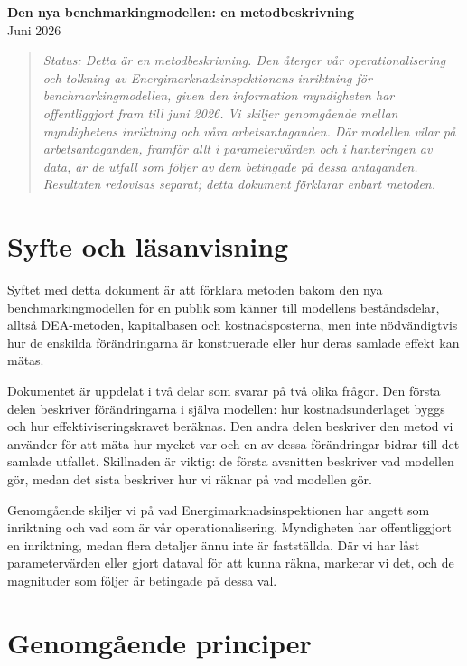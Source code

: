 \documentclass[11pt,a4paper]{article}
\begin{document}
\begin{center}
  {\LARGE\bfseries Den nya benchmarkingmodellen: en metodbeskrivning}\\[4pt]
  {\normalsize Juni 2026}
\end{center}

\begin{quote}\itshape\small
Status: Detta är en metodbeskrivning. Den återger vår operationalisering och tolkning av
Energimarknadsinspektionens inriktning för benchmarkingmodellen, given den information
myndigheten har offentliggjort fram till juni 2026. Vi skiljer genomgående mellan myndighetens
inriktning och våra arbetsantaganden. Där modellen vilar på arbetsantaganden, framför allt i
parametervärden och i hanteringen av data, är de utfall som följer av dem betingade på dessa
antaganden. Resultaten redovisas separat; detta dokument förklarar enbart metoden.
\end{quote}

\section{Syfte och läsanvisning}

Syftet med detta dokument är att förklara metoden bakom den nya benchmarkingmodellen för en
publik som känner till modellens beståndsdelar, alltså DEA-metoden, kapitalbasen och
kostnadsposterna, men inte nödvändigtvis hur de enskilda förändringarna är konstruerade eller
hur deras samlade effekt kan mätas.

Dokumentet är uppdelat i två delar som svarar på två olika frågor. Den första delen beskriver
förändringarna i själva modellen: hur kostnadsunderlaget byggs och hur effektiviseringskravet
beräknas. Den andra delen beskriver den metod vi använder för att mäta hur mycket var och en av
dessa förändringar bidrar till det samlade utfallet. Skillnaden är viktig: de första avsnitten
beskriver vad modellen gör, medan det sista beskriver hur vi räknar på vad modellen gör.

Genomgående skiljer vi på vad Energimarknadsinspektionen har angett som inriktning och vad som
är vår operationalisering. Myndigheten har offentliggjort en inriktning, medan flera detaljer
ännu inte är fastställda. Där vi har låst parametervärden eller gjort dataval för att kunna
räkna, markerar vi det, och de magnituder som följer är betingade på dessa val.

\section{Genomgående principer}
\end{document}
